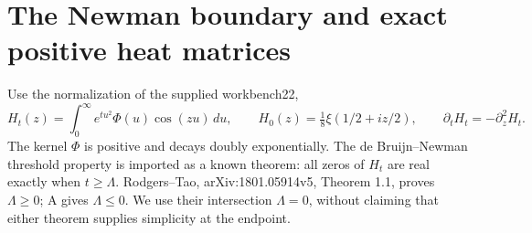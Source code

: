 \section{The Newman boundary and exact positive heat matrices}

Use the normalization of the supplied workbench22,
\[
 H_t(z)=\int_0^\infty e^{tu^2}\Phi(u)\cos(zu)\,du,
 \qquad H_0(z)=\tfrac18\xi(1/2+iz/2),
 \qquad \partial_tH_t=-\partial_z^2H_t.
\]
The kernel $\Phi$ is positive and decays doubly exponentially. The
de Bruijn--Newman threshold property is imported as a known theorem:
all zeros of $H_t$ are real exactly when $t\ge\Lambda$. Rodgers--Tao,
arXiv:1801.05914v5, Theorem 1.1, proves $\Lambda\ge0$; A gives
$\Lambda\le0$. We use their intersection $\Lambda=0$, without claiming
that either theorem supplies simplicity at the endpoint.

